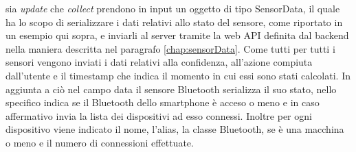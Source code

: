 sia \textit{update} che \textit{collect} prendono in input un oggetto di tipo SensorData, il quale ha lo scopo di serializzare i dati relativi allo stato del sensore, come riportato in un esempio qui sopra, e inviarli al server tramite la web API definita dal backend nella maniera descritta nel paragrafo \ref{chap:sensorData}. Come tutti per tutti i sensori vengono inviati i dati relativi alla confidenza, all'azione compiuta dall'utente e il timestamp che indica il momento in cui essi sono stati calcolati. In aggiunta a ciò nel campo data il sensore Bluetooth serializza il suo stato, nello specifico indica se il Bluetooth dello smartphone è acceso o meno e in caso affermativo invia la lista dei dispositivi ad esso connessi. Inoltre per ogni dispositivo viene indicato il nome, l'alias, la classe Bluetooth, se è una macchina o meno e il numero di connessioni effettuate.

